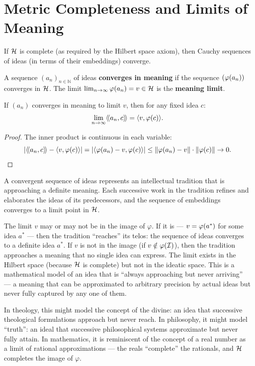 \section{Metric Completeness and Limits of Meaning}

If $\mathcal{H}$ is complete (as required by the Hilbert space axiom), then Cauchy
sequences of ideas (in terms of their embeddings) converge.

\begin{definition}
\label{def:convergent-ideas}
A sequence $(a_n)_{n \in \mathbb{N}}$ of ideas \textbf{converges in meaning}
if the sequence $(\varphi(a_n))$ converges in $\mathcal{H}$. The limit
$\lim_{n \to \infty} \varphi(a_n) = v \in \mathcal{H}$ is the \textbf{meaning
limit}.
\end{definition}

\begin{theorem}
\label{thm:resonance-continuity}
If $(a_n)$ converges in meaning to limit $v$, then for any fixed idea $c$:
\[
  \lim_{n \to \infty} \langle\!\langle a_n, c \rangle\!\rangle = \langle v, \varphi(c) \rangle.
\]
\end{theorem}

\begin{proof}
The inner product is continuous in each variable:
\[
  |\langle\!\langle a_n, c \rangle\!\rangle - \langle v, \varphi(c) \rangle|
  = |\langle \varphi(a_n) - v, \varphi(c) \rangle|
  \leq \lVert \varphi(a_n) - v \rVert \cdot \lVert \varphi(c) \rVert \to 0.
\]
\end{proof}

\begin{interpretation}
\label{interp:limit}
A convergent sequence of ideas represents an intellectual tradition that is
approaching a definite meaning. Each successive work in the tradition refines
and elaborates the ideas of its predecessors, and the sequence of embeddings
converges to a limit point in $\mathcal{H}$.

The limit $v$ may or may not be in the image of $\varphi$. If it is ---
$v = \varphi(a^*)$ for some idea $a^*$ --- then the tradition ``reaches'' its
telos: the sequence of ideas converges to a definite idea $a^*$. If $v$ is
not in the image (if $v \notin \varphi(\mathcal{I})$), then the tradition approaches
a meaning that no single idea can express. The limit exists in the Hilbert
space (because $\mathcal{H}$ is complete) but not in the ideatic space. This is a
mathematical model of an idea that is ``always approaching but never arriving''
--- a meaning that can be approximated to arbitrary precision by actual ideas
but never fully captured by any one of them.

In theology, this might model the concept of the divine: an idea that
successive theological formulations approach but never reach. In philosophy,
it might model ``truth'': an ideal that successive philosophical systems
approximate but never fully attain. In mathematics, it is reminiscent of the
concept of a real number as a limit of rational approximations --- the reals
``complete'' the rationals, and $\mathcal{H}$ completes the image of $\varphi$.
\end{interpretation}

